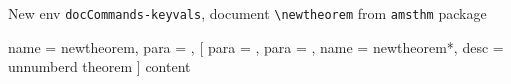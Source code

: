 \documentclass{article}
\begin{document}
\begin{example}{New env \Verb|docCommands-keyvals|, document \Verb|\newtheorem| from \Verb|amsthm| package}
  \begin{docCommands-keyvals}
    {
      name = newtheorem,
      para = ,
    }
    [
      para = ,
      para = ,
      {
        name = newtheorem*,
        desc = unnumberd theorem
      }
    ]
    content
  \end{docCommands-keyvals}
\end{example}

\printindex
\end{document}
